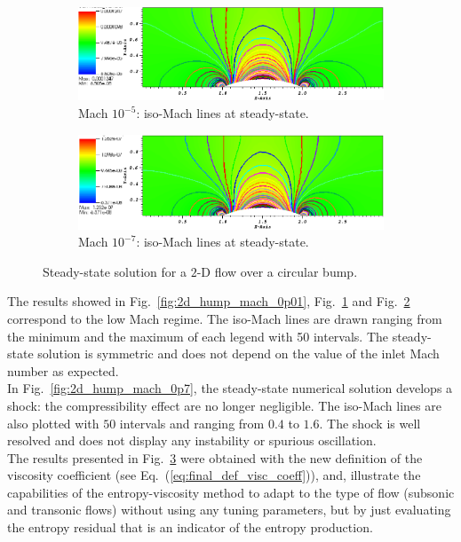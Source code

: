 \documentclass[preprint,10pt]{elsarticle}
\newcommand{\eqt}[1]{Eq.~(\ref{#1})}                     %
\newcommand{\fig}[1]{Fig.~\ref{#1}}                      %
\begin{document}
\begin{figure}[H]
        \begin{subfigure}[b]{0.495\textwidth}
                \centering
                \includegraphics[width=\textwidth]{Hump2D_mach_1em4.png}
                \caption{Mach $10^{-5}$: iso-Mach lines at steady-state.}
                \label{fig:2d_hump_mach_0p0001}
        \end{subfigure}
        \begin{subfigure}[b]{0.495\textwidth}
                \centering
                \includegraphics[width=\textwidth]{Hump2D_mach_1em7.png}
                \caption{Mach $10^{-7}$: iso-Mach lines at steady-state.}
                \label{fig:2d_hump_mach_0p0000001}
        \end{subfigure}
        \caption{Steady-state solution for a $2$-D flow over a circular bump.}\label{fig:2d_hump}
\end{figure}
The results showed in \fig{fig:2d_hump_mach_0p01}, \fig{fig:2d_hump_mach_0p0001} and \fig{fig:2d_hump_mach_0p0000001} correspond to the low Mach regime. The iso-Mach lines are drawn ranging from the minimum and the maximum of each legend with 50 intervals. The steady-state solution is symmetric and does not depend on the value of the inlet Mach number as expected. \\
In \fig{fig:2d_hump_mach_0p7}, the steady-state numerical solution develops a shock: the compressibility effect are no longer negligible. The iso-Mach lines are also plotted with $50$ intervals and ranging from $0.4$ to $1.6$. The shock is well resolved and does not display any instability or spurious oscillation. \\
The results presented in \fig{fig:2d_hump} were obtained with the new definition of the viscosity coefficient (see \eqt{eq:final_def_visc_coeff}), and, illustrate the capabilities of the entropy-viscosity method to adapt to the type of flow (subsonic and transonic flows) without using any tuning parameters, but by just evaluating the entropy residual that is an indicator of the entropy production.    
\end{document}
